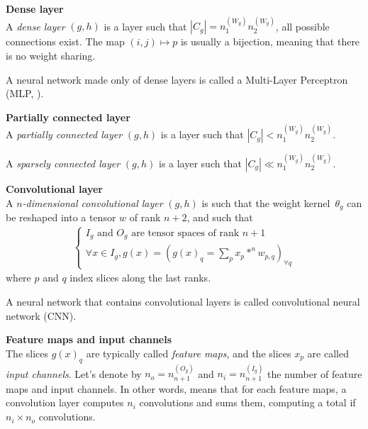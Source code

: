 \begin{definition}\textbf{Dense layer}\\
A \emph{dense layer} $(g,h)$ is a layer such that $|C_g| = n_1^{(W_g)} n_2^{(W_g)}$, \ie all possible connections exist. The map $(i,j) \mapsto p$ is usually a bijection, meaning that there is no weight sharing.
\end{definition}

A neural network made only of dense layers is called a Multi-Layer Perceptron (MLP, \cite{hornik1989multilayer}).

\begin{definition}\textbf{Partially connected layer}\\{}
A \emph{partially connected layer} $(g,h)$ is a layer such that $|C_g| < n_1^{(W_g)} n_2^{(W_g)}$.

A \emph{sparsely connected layer} $(g,h)$ is a layer such that $|C_g| \ll n_1^{(W_g)} n_2^{(W_g)}$.
\end{definition}

\begin{definition}\textbf{Convolutional layer}\\
A \emph{$n$-dimensional convolutional layer} $(g,h)$ is such that the weight kernel~$\theta_g$ can be reshaped into a tensor $w$ of rank $n+2$, and such that
\begin{gather*}
\left\{
\begin{array}{l}
  I_g \mbox{ and } O_g \mbox{ are tensor spaces of rank }n+1 \\
  \forall x \in I_g, g(x) = (g(x)_q = \sum\limits_p{x_p \ast^n w_{p,q}})_{\forall q}
\end{array}
\right.
\end{gather*}
where $p$ and $q$ index slices along the last ranks.
\label{def:convlayer}
\end{definition}

A neural network that contains convolutional layers is called convolutional neural network (CNN).

\begin{definition}\textbf{Feature maps and input channels}\\
The slices $g(x)_q$ are typically called \textit{feature maps}, and the slices $x_p$ are called \textit{input channels}. Let's denote by $n_o = n_{n+1}^{(O_g)}$ and $n_i =n_{n+1}^{(I_g)}$ the number of feature maps and input channels.
In other words,  means that for each feature maps, a convolution layer computes $n_i$ convolutions and sums them, computing a total if $n_i \times n_o$ convolutions.
\end{definition}

